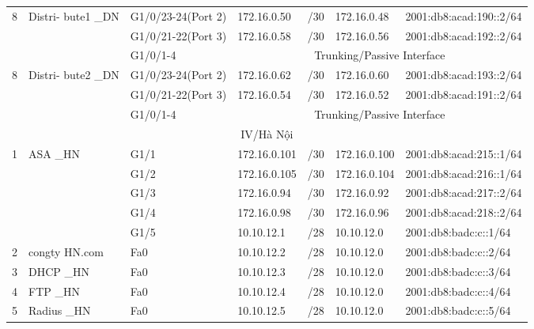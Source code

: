 \documentclass[12pt,a4paper]{report}
\begin{document}
\begin{center}
\begin{longtable}{|p{}|p{}|p{}|p{}|p{}|p{}|p{}|}
\hline  \multirow{3}{*}{8}  &  Distri- bute1 \_DN  &  G1/0/23-24(Port 2)  &  172.16.0.50  &  /30  &  172.16.0.48  &  2001:db8:acad:190::2/64 \\\cline{3-7}
&    &  G1/0/21-22(Port 3)  &  172.16.0.58  &  /30  &  172.16.0.56  &  2001:db8:acad:192::2/64 \\\cline{3-7}
&    &  G1/0/1-4  &    \multicolumn{4}{|c|}{Trunking/Passive Interface} \\\cline{3-7}

\hline  \multirow{3}{*}{8}  &  Distri- bute2 \_DN  &  G1/0/23-24(Port 2)  &  172.16.0.62  &  /30  &  172.16.0.60  &  2001:db8:acad:193::2/64 \\\cline{3-7}
&     &  G1/0/21-22(Port 3)  &  172.16.0.54  &  /30  &  172.16.0.52  &  2001:db8:acad:191::2/64 \\\cline{3-7}
&     &  G1/0/1-4  &    \multicolumn{4}{|c|}{Trunking/Passive Interface} \\\cline{3-7}


\hline  \multicolumn{7}{|c|}{IV/Hà Nội} \\
        \hline \multirow{5}{*}{1} &  ASA \_HN  &  G1/1  &  172.16.0.101  &  /30  &  172.16.0.100  &  2001:db8:acad:215::1/64  \\\cline{3-7}		                          &    &  G1/2  &  172.16.0.105  &  /30  &  172.16.0.104  &  2001:db8:acad:216::1/64\\\cline{3-7}	                          		                          &     &  G1/3  &  172.16.0.94  &  /30  &  172.16.0.92  &  2001:db8:acad:217::2/64\\\cline{3-7}                                             		                          &    &  G1/4  &  172.16.0.98  &  /30  &  172.16.0.96  &  2001:db8:acad:218::2/64\\\cline{3-7}                 		                          &     &  G1/5  &  10.10.12.1  &  /28  &  10.10.12.0  &  2001:db8:badc:c::1/64\\\cline{3-7}
        
        \hline  2  &  congty HN.com  &  Fa0  &  10.10.12.2  &  /28  &  10.10.12.0  &  2001:db8:badc:c::2/64  \\
\hline  3  &  DHCP \_HN  &  Fa0  &  10.10.12.3  &  /28  &  10.10.12.0  &  2001:db8:badc:c::3/64 \\
\hline  4  &  FTP \_HN  &  Fa0  &  10.10.12.4  &  /28  &  10.10.12.0  &  2001:db8:badc:c::4/64  \\
\hline  5  &  Radius \_HN  &  Fa0  &  10.10.12.5  &  /28  &  10.10.12.0  &  2001:db8:badc:c::5/64 \\


\end{longtable}
\end{center}
\end{document}
